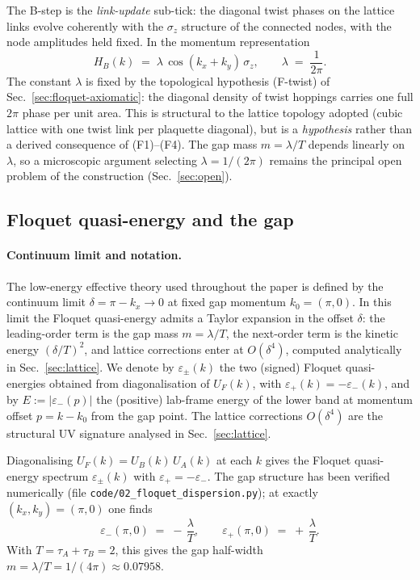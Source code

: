 \documentclass[11pt,a4paper]{article}
\begin{document}
The B-step is the \emph{link-update} sub-tick: the diagonal
twist phases on the lattice links evolve coherently with the
$\sigma_z$ structure of the connected nodes, with the node
amplitudes held fixed. In the momentum representation
\begin{equation}
H_B(k) \;=\; \lambda\,\cos(k_x + k_y)\,\sigma_z,
\qquad
\lambda \;=\; \frac{1}{2\pi}.
\label{eq:HB}
\end{equation}
The constant $\lambda$ is fixed by the topological hypothesis
(F-twist) of Sec.~\ref{sec:floquet-axiomatic}: the diagonal
density of twist hoppings carries one full $2\pi$ phase per
unit area. This is structural to the lattice topology adopted
(cubic lattice with one twist link per plaquette diagonal),
but is a \emph{hypothesis} rather than a derived consequence
of (F1)--(F4). The gap mass $m = \lambda/T$ depends linearly
on $\lambda$, so a microscopic argument selecting
$\lambda = 1/(2\pi)$ remains the principal open problem of the
construction (Sec.~\ref{sec:open}).

\subsection{Floquet quasi-energy and the gap}

\paragraph{Continuum limit and notation.}
The low-energy effective theory used throughout the paper is
defined by the continuum limit $\delta = \pi - k_x \to 0$ at
fixed gap momentum $k_0 = (\pi, 0)$. In this limit the Floquet
quasi-energy admits a Taylor expansion in the offset
$\delta$: the leading-order term is the gap mass
$m = \lambda/T$, the next-order term is the kinetic energy
$(\delta/T)^2$, and lattice corrections enter at
$O(\delta^4)$, computed analytically in
Sec.~\ref{sec:lattice}. We denote by $\varepsilon_\pm(k)$ the
two (signed) Floquet quasi-energies obtained from
diagonalisation of $U_F(k)$, with $\varepsilon_+(k) =
-\varepsilon_-(k)$, and by $E := |\varepsilon_-(p)|$ the
(positive) lab-frame energy of the lower band at momentum
offset $p = k - k_0$ from the gap point. The lattice corrections
$O(\delta^4)$ are the structural UV signature analysed in
Sec.~\ref{sec:lattice}.

Diagonalising $U_F(k) = U_B(k)\,U_A(k)$ at each $k$ gives the
Floquet quasi-energy spectrum $\varepsilon_\pm(k)$ with
$\varepsilon_+ = -\varepsilon_-$. The gap structure has been
verified numerically (file
\texttt{code/02\_floquet\_dispersion.py}); at exactly
$(k_x, k_y) = (\pi, 0)$ one finds
\begin{equation}
\varepsilon_-(\pi, 0) \;=\; -\,\frac{\lambda}{T},
\qquad
\varepsilon_+(\pi, 0) \;=\; +\,\frac{\lambda}{T}.
\label{eq:gap}
\end{equation}
With $T = \tau_A + \tau_B = 2$, this gives the gap half-width
$m = \lambda/T = 1/(4\pi) \approx 0.07958$.
\end{document}
